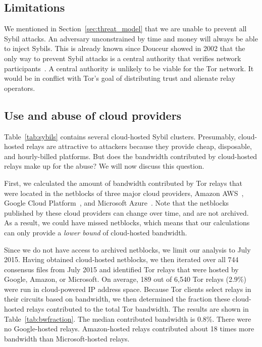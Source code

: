 \subsection{Limitations}
\label{sec:limitations}
We mentioned in Section~\ref{sec:threat_model} that we are unable to prevent
all Sybil attacks.  An adversary unconstrained by time and money will always
be able to inject Sybils.  This is already known since Douceur showed in 2002
that the only way to prevent Sybil attacks is a central authority that verifies
network participants~\cite{Douceur2002a}.  A central authority is unlikely to
be viable for the Tor network.  It would be in conflict with Tor's goal of
distributing trust and alienate relay operators.



\subsection{Use and abuse of cloud providers}
\label{sec:cloud}
Table~\ref{tab:sybils} contains several cloud-hosted Sybil clusters.
Presumably, cloud-hosted relays are attractive to attackers because they
provide cheap, disposable, and hourly-billed platforms.  But does the bandwidth
contributed by cloud-hosted relays make up for the abuse?  We will now discuss
this question.

First, we calculated the amount of bandwidth contributed by Tor relays that
were located in the netblocks of three major cloud providers, Amazon
AWS~\cite{amazonaws}, Google Cloud Platform~\cite{googlecloud}, and Microsoft
Azure~\cite{azure}.  Note that the netblocks published by these cloud providers
can change over time, and are not archived.  As a result, we could have missed
netblocks, which means that our calculations can only provide a \emph{lower
bound} of cloud-hosted bandwidth.

Since we do not have access to archived netblocks, we limit our analysis to
July 2015.  Having obtained cloud-hosted netblocks, we then iterated over all
744 consensus files from July 2015 and identified Tor relays that were hosted
by Google, Amazon, or Microsoft.  On average, 189 out of 6,540 Tor relays
(2.9\%) were run in cloud-powered IP address space.  Because Tor
clients select relays in their circuits based on bandwidth, we then determined
the fraction these cloud-hosted relays contributed to the total Tor bandwidth.
The results are shown in Table~\ref{tab:bwfraction}.  The median contributed
bandwidth is 0.8\%.  There were no Google-hosted relays.  Amazon-hosted relays
contributed about 18 times more bandwidth than Microsoft-hosted relays.

